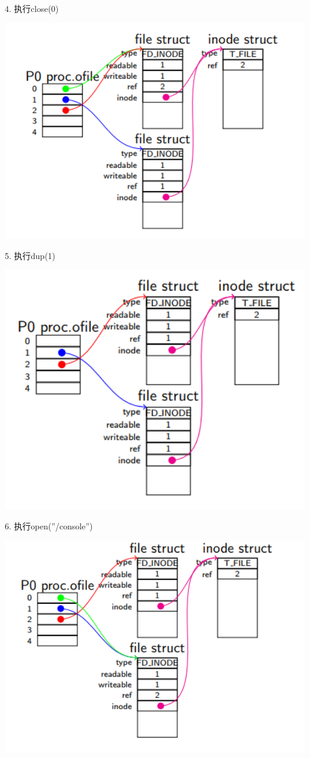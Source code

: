 4. 执行close(0)

\includegraphics[width=6in]{figures/eg_file/image159.png}

5. 执行dup(1)

\includegraphics[width=6in]{figures/eg_file/image160.png}

6. 执行open(”/console”)

\includegraphics[width=6in]{figures/eg_file/image161.png}

